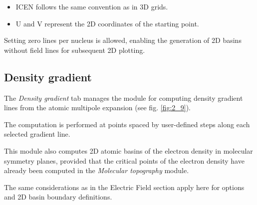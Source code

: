 \documentclass[10pt]{article}
\begin{document}
\begin{itemize}
\item ICEN follows the same convention as in 3D grids.
\item U and V represent the 2D coordinates of the starting point.
\end{itemize}

Setting zero lines per nucleus is allowed, enabling the generation of 2D basins without field lines
for subsequent 2D plotting.

\subsection{Density gradient \label{sec:2.9}}



The {\it Density gradient} tab manages the module for computing
density gradient lines
from the atomic multipole expansion (see fig. \ref{fig:2_9}).

The computation is performed at points spaced by user-defined steps
along each selected gradient line.

This module also computes 2D atomic basins
of the electron density in molecular symmetry planes,
provided that the critical points of the electron density
have already been computed in the {\it Molecular topography} module.

The same considerations as in the Electric Field section apply here
for options and 2D basin boundary definitions.
 
\end{document}
